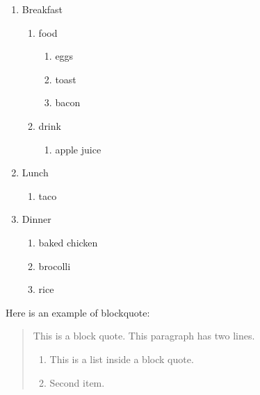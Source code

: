 \documentclass[
]{article}
\providecommand{\tightlist}{%
  \setlength{\itemsep}{0pt}\setlength{\parskip}{0pt}}
\begin{document}
\begin{enumerate}
\def\labelenumi{\arabic{enumi}.}
\tightlist
\item
  Breakfast

  \begin{enumerate}
  \def\labelenumii{\alph{enumii}.}
  \tightlist
  \item
    food

    \begin{enumerate}
    \def\labelenumiii{\roman{enumiii}.}
    \tightlist
    \item
      eggs
    \item
      toast
    \item
      bacon
    \end{enumerate}
  \item
    drink

    \begin{enumerate}
    \def\labelenumiii{\roman{enumiii}.}
    \tightlist
    \item
      apple juice
    \end{enumerate}
  \end{enumerate}
\item
  Lunch

  \begin{enumerate}
  \def\labelenumii{\alph{enumii}.}
  \tightlist
  \item
    taco
  \end{enumerate}
\item
  Dinner

  \begin{enumerate}
  \def\labelenumii{\alph{enumii}.}
  \tightlist
  \item
    baked chicken
  \item
    brocolli
  \item
    rice
  \end{enumerate}
\end{enumerate}

Here is an example of blockquote:

\begin{quote}
This is a block quote. This paragraph has two lines.

\begin{enumerate}
\def\labelenumi{\arabic{enumi}.}
\tightlist
\item
  This is a list inside a block quote.
\item
  Second item.
\end{enumerate}
\end{quote}
\end{document}
